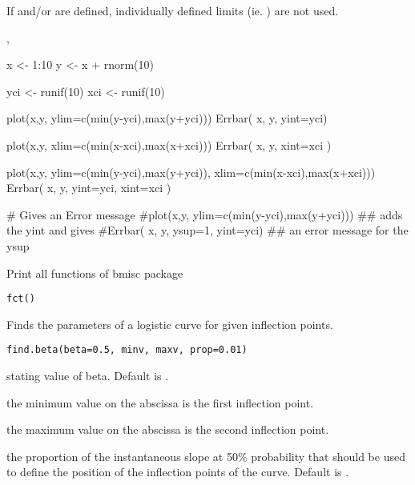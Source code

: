 \documentclass[a4paper]{book}
\begin{document}
%
\begin{Details}\relax
If  and/or  are defined, individually defined limits (ie. ) are not used.
\end{Details}
%
\begin{SeeAlso}\relax
{}, 
\end{SeeAlso}
%
\begin{Examples}
\begin{ExampleCode}
x <- 1:10
y <- x + rnorm(10)

yci <- runif(10)
xci <- runif(10)

plot(x,y, ylim=c(min(y-yci),max(y+yci)))
Errbar( x, y, yint=yci)

plot(x,y, xlim=c(min(x-xci),max(x+xci)))
Errbar( x, y, xint=xci )

plot(x,y, ylim=c(min(y-yci),max(y+yci)), xlim=c(min(x-xci),max(x+xci)))
Errbar( x, y, yint=yci, xint=xci )

# Gives an Error message
#plot(x,y, ylim=c(min(y-yci),max(y+yci)))  ## adds the yint and gives
#Errbar( x, y, ysup=1, yint=yci)            ## an error message for the ysup

\end{ExampleCode}
\end{Examples}
\newpage
{}
%
\begin{Description}\relax
Print all functions of bmisc package
\end{Description}
%
\begin{Usage}
\begin{verbatim}
fct()
\end{verbatim}
\end{Usage}
\newpage
{}
%
\begin{Description}\relax
Finds the parameters of a logistic curve for given inflection points.
\end{Description}
%
\begin{Usage}
\begin{verbatim}
find.beta(beta=0.5, minv, maxv, prop=0.01)
\end{verbatim}
\end{Usage}
%
\begin{Arguments}
\begin{ldescription}
\item[\code{beta}] stating value of beta. Default is .
\item[\code{minv}] the minimum value on the abscissa is the first inflection point.
\item[\code{maxv}] the maximum value on the abscissa is the second inflection point.
\item[\code{prop}] the proportion of the instantaneous slope at 50\% probability that should be used to define the position of the inflection points of the curve. Default is .


\end{ldescription}
\end{Arguments}
\end{document}
